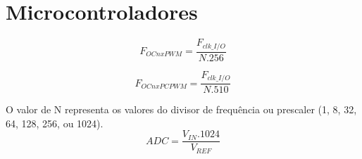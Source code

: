 \label{mcu}
\section*{Microcontroladores}
\vspace{1cm}
	\begin{equation}
\boxed{F_{OCnxPWM}=\frac{F_{clk\_I/O}}{N.256}}
	\end{equation} \par
	\begin{equation}
\boxed{F_{OCnxPCPWM}=\frac{F_{clk\_I/O}}{N.510}}
	\end{equation} \par
O valor de N representa os valores do divisor de frequ\^{e}ncia ou prescaler (1, 8, 32, 64, 128, 256, ou 1024).
	\begin{equation}
\boxed{ADC=\frac{V_{IN}.1024}{V_{REF}}}
	\end{equation} \par
